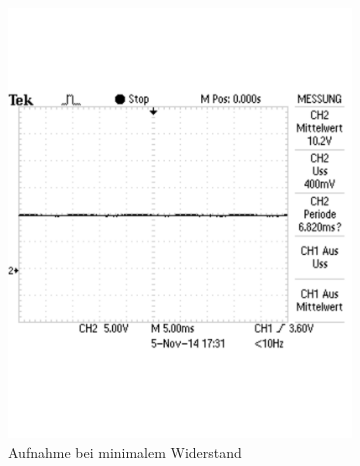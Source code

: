 \documentclass[12pt,a4paper]{article}
\begin{document}
\begin{figure}[H]
        \centering
        \begin{subfigure}[b]{0.48\textwidth}
                \includegraphics[width=\textwidth , scale = 0.4]{2_6_1000F_1.pdf}
                \caption[Aufnahme bei minimalem Widerstand]{Aufnahme bei minimalem Widerstand}
 				 \label{fig:2_6_1000F_1}
        \end{subfigure}%
        \hfill
        \begin{subfigure}[b]{0.48\textwidth}

\end{subfigure}
\end{figure}
\end{document}
